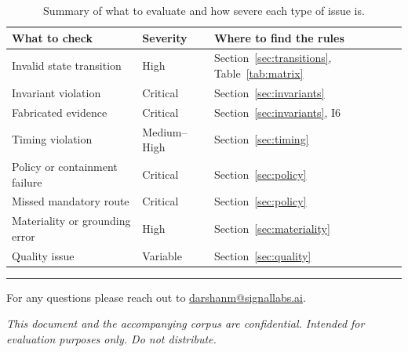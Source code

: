 \documentclass[11pt, a4paper]{article}
\begin{document}
\begin{table}[h]
\centering
\begin{tabular}{llp{5.6cm}}
\toprule
\textbf{What to check} & \textbf{Severity} & \textbf{Where to find the rules} \\
\midrule
Invalid state transition & High & Section~\ref{sec:transitions}, Table~\ref{tab:matrix} \\
Invariant violation & Critical & Section~\ref{sec:invariants} \\
Fabricated evidence & Critical & Section~\ref{sec:invariants}, I6 \\
Timing violation & Medium--High & Section~\ref{sec:timing} \\
Policy or containment failure & Critical & Section~\ref{sec:policy} \\
Missed mandatory route & Critical & Section~\ref{sec:policy} \\
Materiality or grounding error & High & Section~\ref{sec:materiality} \\
Quality issue & Variable & Section~\ref{sec:quality} \\
\bottomrule
\end{tabular}
\caption{Summary of what to evaluate and how severe each type of issue is.}
\end{table}

\vfill
\noindent\rule{\textwidth}{0.4pt}
\small
\noindent For any questions please reach out to \href{mailto:darshanm@signallabs.ai}{darshanm@signallabs.ai}.

\smallskip
\noindent\textit{This document and the accompanying corpus are confidential. Intended for evaluation purposes only. Do not distribute.}
\end{document}
